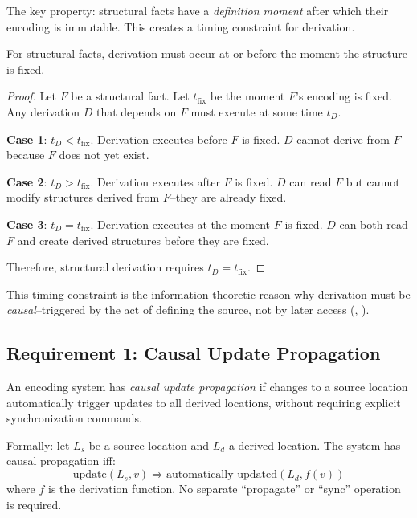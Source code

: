 The key property: structural facts have a \emph{definition moment} after which their encoding is immutable. This creates a timing constraint for derivation.

\begin{theorem}\label{thm:timing-forces}
For structural facts, derivation must occur at or before the moment the structure is fixed.
\end{theorem}

\begin{proof}
Let $F$ be a structural fact. Let $t_{\text{fix}}$ be the moment $F$'s encoding is fixed. Any derivation $D$ that depends on $F$ must execute at some time $t_D$.

\textbf{Case 1}: $t_D < t_{\text{fix}}$. Derivation executes before $F$ is fixed. $D$ cannot derive from $F$ because $F$ does not yet exist.

\textbf{Case 2}: $t_D > t_{\text{fix}}$. Derivation executes after $F$ is fixed. $D$ can read $F$ but cannot modify structures derived from $F$--they are already fixed.

\textbf{Case 3}: $t_D = t_{\text{fix}}$. Derivation executes at the moment $F$ is fixed. $D$ can both read $F$ and create derived structures before they are fixed.

Therefore, structural derivation requires $t_D = t_{\text{fix}}$.
\end{proof}

This timing constraint is the information-theoretic reason why derivation must be \emph{causal}--triggered by the act of defining the source, not by later access (, ).

\subsection{Requirement 1: Causal Update Propagation}\label{sec:causal-propagation}

\begin{definition}\label{def:causal-propagation}
An encoding system has \emph{causal update propagation} if changes to a source location automatically trigger updates to all derived locations, without requiring explicit synchronization commands.

Formally: let $L_s$ be a source location and $L_d$ a derived location. The system has causal propagation iff:
\[
\text{update}(L_s, v) \Rightarrow \text{automatically\_updated}(L_d, f(v))
\]
where $f$ is the derivation function. No separate ``propagate'' or ``sync'' operation is required.
\end{definition}

